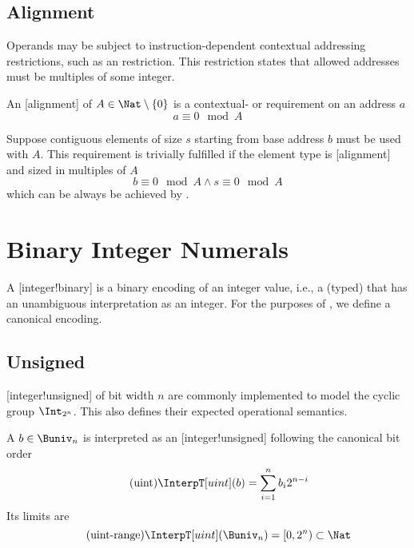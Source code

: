 \subsection{Alignment}

Operands may be subject to instruction-dependent contextual addressing restrictions, such as an  restriction.
This restriction states that allowed addresses must be multiples of some integer.

\begin{definition}[Alignment]
    An [alignment] of \(A \in \Nat\setminus\{0\}\) is a contextual- or  requirement on an  address \(a\)
    \begin{equation*}
        a \equiv 0 \mod A
    \end{equation*}
\end{definition}

Suppose contiguous elements of size \(s\) starting from base address \(b\) must be used with  \(A\).
This requirement is trivially fulfilled if the element type is [alignment] and sized in multiples of \(A\)
\begin{equation*}
    b \equiv 0 \mod A \land s \equiv 0 \mod A
\end{equation*}
which can be always be achieved by .

\section{Binary Integer Numerals}

A [integer!binary] is a binary encoding of an integer value, i.e., a (typed)  that has an unambiguous interpretation as an integer.
For the purposes of \basetwo, we define a canonical encoding.

\subsection{Unsigned}

[integer!unsigned] of bit width \(n\) are commonly implemented to model the cyclic group \(\Int_{2^n}\).
This also defines their expected operational semantics.

\begin{definition}
    A  \(b \in \Buniv_n\) is interpreted as an [integer!unsigned] following the canonical bit order
    \begin{equation}
        \label{eq:uint}
        \tag{uint}
        \InterpT[uint](b) = \sum_{i = 1}^{n} b_i 2^{n-i}
    \end{equation}
    Its limits are
    \begin{equation}
        \label{eq:uint_range}
        \tag{uint-range}
        \InterpT[uint](\Buniv_n) = [0, 2^n) \subset \Nat
    \end{equation}
\end{definition}

